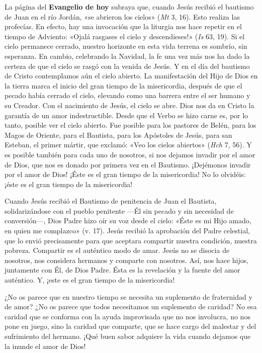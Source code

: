 \documentclass[]{article}
\begin{document}
La página del \textbf{Evangelio de hoy} subraya que, cuando Jesús
recibió el bautismo de Juan en el río Jordán, «se abrieron los cielos»
(\emph{Mt} 3, 16). Esto realiza las profecías. En efecto, hay una
invocación que la liturgia nos hace repetir en el tiempo de Adviento:
«Ojalá rasgases el cielo y descendieses!» (\emph{Is} 63, 19). Si el
cielo permanece cerrado, nuestro horizonte en esta vida terrena es
sombrío, sin esperanza. En cambio, celebrando la Navidad, la fe una vez
más nos ha dado la certeza de que el cielo se rasgó con la venida de
Jesús. Y en el día del bautismo de Cristo contemplamos aún el cielo
abierto. La manifestación del Hijo de Dios en la tierra marca el inicio
del gran tiempo de la misericordia, después de que el pecado había
cerrado el cielo, elevando como una barrera entre el ser humano y su
Creador. Con el nacimiento de Jesús, el cielo se abre. Dios nos da en
Cristo la garantía de un amor indestructible. Desde que el Verbo se hizo
carne es, por lo tanto, posible ver el cielo abierto. Fue posible para
los pastores de Belén, para los Magos de Oriente, para el Bautista, para
los Apóstoles de Jesús, para san Esteban, el primer mártir, que exclamó:
«Veo los cielos abiertos» (\emph{Hch} 7, 56). Y es posible también para
cada uno de nosotros, si nos dejamos invadir por el amor de Dios, que
nos es donado por primera vez en el Bautismo. ¡Dejémonos invadir por el
amor de Dios! ¡Éste es el gran tiempo de la misericordia! No lo
olvidéis: ¡éste es el gran tiempo de la misericordia!

Cuando Jesús recibió el Bautismo de penitencia de Juan el Bautista,
solidarizándose con el pueblo penitente ---Él sin pecado y sin necesidad
de conversión---, Dios Padre hizo oír su voz desde el cielo: «Éste es mi
Hijo amado, en quien me complazco» (v. 17). Jesús recibió la aprobación
del Padre celestial, que lo envió precisamente para que aceptara
compartir nuestra condición, nuestra pobreza. Compartir es el auténtico
modo de amar. Jesús no se disocia de nosotros, nos considera hermanos y
comparte con nosotros. Así, nos hace hijos, juntamente con Él, de Dios
Padre. Ésta es la revelación y la fuente del amor auténtico. Y, ¡este es
el gran tiempo de la misericordia!

¿No os parece que en nuestro tiempo se necesita un suplemento de
fraternidad y de amor? ¿No os parece que todos necesitamos un suplemento
de caridad? No esa caridad que se conforma con la ayuda improvisada que
no nos involucra, no nos pone en juego, sino la caridad que comparte,
que se hace cargo del malestar y del sufrimiento del hermano. ¡Qué buen
sabor adquiere la vida cuando dejamos que la inunde el amor de Dios!
\end{document}
